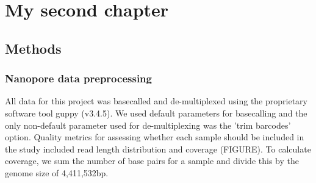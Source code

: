 
\chapter{My second chapter}

\ifpdf
    \graphicspath{{Chapter2/Figs/Raster/}{Chapter2/Figs/PDF/}{Chapter2/Figs/}}
\else
    \graphicspath{{Chapter2/Figs/Vector/}{Chapter2/Figs/}}
\fi

\section{Methods}

\subsection{Nanopore data preprocessing}

All \ont{} data for this project was basecalled and de-multiplexed using the \ont{} proprietary software tool guppy (v3.4.5). We used default parameters for basecalling and the only non-default parameter used for de-multiplexing was the 'trim barcodes' option.  
Quality metrics for assessing whether each sample should be included in the study included read length distribution and coverage (FIGURE). To calculate coverage, we sum the number of base pairs for a sample and divide this by the \mtb{} genome size of 4,411,532bp.


